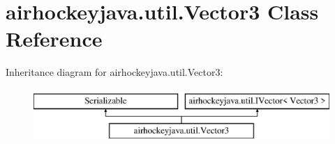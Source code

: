 \hypertarget{classairhockeyjava_1_1util_1_1_vector3}{}\section{airhockeyjava.\+util.\+Vector3 Class Reference}
\label{classairhockeyjava_1_1util_1_1_vector3}
Inheritance diagram for airhockeyjava.\+util.\+Vector3\+:\begin{figure}[H]
\begin{center}
\leavevmode
\includegraphics[height=2.000000cm]{classairhockeyjava_1_1util_1_1_vector3}
\end{center}
\end{figure}

